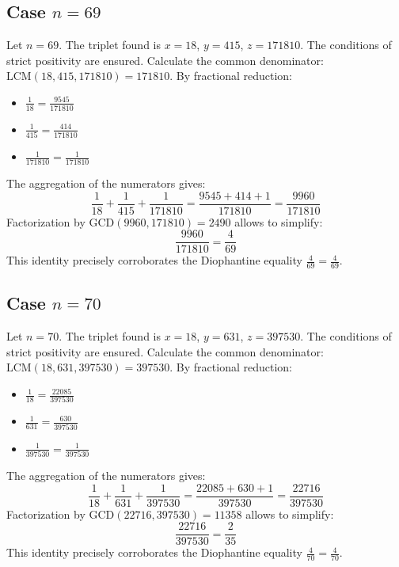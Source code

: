\documentclass[11pt,a4paper]{article}
\begin{document}
\subsection{Case $n = 69$}
Let $n = 69$. The triplet found is $x = 18$, $y = 415$, $z = 171810$.
The conditions of strict positivity are ensured.
Calculate the common denominator: $\text{LCM}(18, 415, 171810) = 171810$.
By fractional reduction:
\begin{itemize}
    \item $\frac{1}{18} = \frac{9545}{171810}$
    \item $\frac{1}{415} = \frac{414}{171810}$
    \item $\frac{1}{171810} = \frac{1}{171810}$
\end{itemize}
The aggregation of the numerators gives:
$$ \frac{1}{18} + \frac{1}{415} + \frac{1}{171810} = \frac{9545 + 414 + 1}{171810} = \frac{9960}{171810} $$
Factorization by $\text{GCD}(9960, 171810) = 2490$ allows to simplify:
$$ \frac{9960}{171810} = \frac{4}{69} $$
This identity precisely corroborates the Diophantine equality $\frac{4}{69} = \frac{4}{69}$.

\subsection{Case $n = 70$}
Let $n = 70$. The triplet found is $x = 18$, $y = 631$, $z = 397530$.
The conditions of strict positivity are ensured.
Calculate the common denominator: $\text{LCM}(18, 631, 397530) = 397530$.
By fractional reduction:
\begin{itemize}
    \item $\frac{1}{18} = \frac{22085}{397530}$
    \item $\frac{1}{631} = \frac{630}{397530}$
    \item $\frac{1}{397530} = \frac{1}{397530}$
\end{itemize}
The aggregation of the numerators gives:
$$ \frac{1}{18} + \frac{1}{631} + \frac{1}{397530} = \frac{22085 + 630 + 1}{397530} = \frac{22716}{397530} $$
Factorization by $\text{GCD}(22716, 397530) = 11358$ allows to simplify:
$$ \frac{22716}{397530} = \frac{2}{35} $$
This identity precisely corroborates the Diophantine equality $\frac{4}{70} = \frac{4}{70}$.
\end{document}
